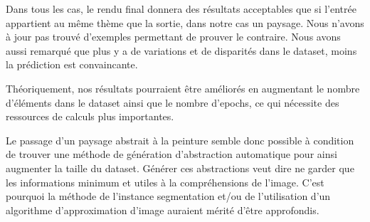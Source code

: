 \documentclass[a4paper, 12pt]{report}
\begin{document}
Dans tous les cas, le rendu final donnera des résultats acceptables que si l'entrée appartient au même thème que la sortie, dans notre cas un paysage. Nous n'avons à jour pas trouvé d'exemples permettant de prouver le contraire. Nous avons aussi remarqué que plus y a de variations et de disparités dans le dataset, moins la prédiction est convaincante.

Théoriquement, nos résultats pourraient être améliorés en augmentant le nombre d'éléments dans le dataset ainsi que le nombre d'epochs, ce qui nécessite des ressources de calculs plus importantes.

Le passage d'un paysage abstrait à la peinture semble donc possible à condition de trouver une méthode de génération d'abstraction automatique pour ainsi augmenter la taille du dataset. Générer ces abstractions veut dire ne garder que les informations minimum et utiles à la compréhensions de l'image. C'est pourquoi la méthode de l'instance segmentation et/ou de l’utilisation d'un algorithme d'approximation d'image auraient mérité d'être approfondis.



\end{document}
